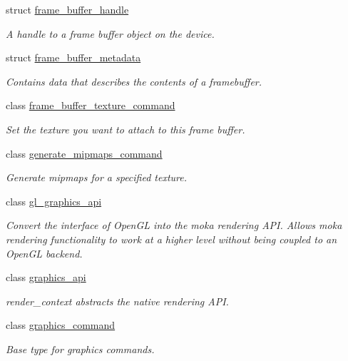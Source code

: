 \begin{DoxyCompactItemize}
struct \mbox{\hyperlink{structmoka_1_1frame__buffer__handle}{frame\+\_\+buffer\+\_\+handle}}
\begin{DoxyCompactList}\small\item\em A handle to a frame buffer object on the device. \end{DoxyCompactList}\item 
struct \mbox{\hyperlink{structmoka_1_1frame__buffer__metadata}{frame\+\_\+buffer\+\_\+metadata}}
\begin{DoxyCompactList}\small\item\em Contains data that describes the contents of a framebuffer. \end{DoxyCompactList}\item 
class \mbox{\hyperlink{classmoka_1_1frame__buffer__texture__command}{frame\+\_\+buffer\+\_\+texture\+\_\+command}}
\begin{DoxyCompactList}\small\item\em Set the texture you want to attach to this frame buffer. \end{DoxyCompactList}\item 
class \mbox{\hyperlink{classmoka_1_1generate__mipmaps__command}{generate\+\_\+mipmaps\+\_\+command}}
\begin{DoxyCompactList}\small\item\em Generate mipmaps for a specified texture. \end{DoxyCompactList}\item 
class \mbox{\hyperlink{classmoka_1_1gl__graphics__api}{gl\+\_\+graphics\+\_\+api}}
\begin{DoxyCompactList}\small\item\em Convert the interface of Open\+GL into the moka rendering A\+PI. Allows moka rendering functionality to work at a higher level without being coupled to an Open\+GL backend. \end{DoxyCompactList}\item 
class \mbox{\hyperlink{classmoka_1_1graphics__api}{graphics\+\_\+api}}
\begin{DoxyCompactList}\small\item\em render\+\_\+context abstracts the native rendering A\+PI. \end{DoxyCompactList}\item 
class \mbox{\hyperlink{classmoka_1_1graphics__command}{graphics\+\_\+command}}
\begin{DoxyCompactList}\small\item\em Base type for graphics commands. \end{DoxyCompactList}\item 

\end{DoxyCompactItemize}
